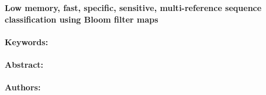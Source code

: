 \noindent
\large {\bf Low memory, fast, specific, sensitive, multi-reference sequence classification using Bloom filter maps} 


\normalsize 


\noindent \paragraph{Keywords:} 

\noindent \paragraph{Abstract:} 



\noindent \paragraph{Authors:} 

